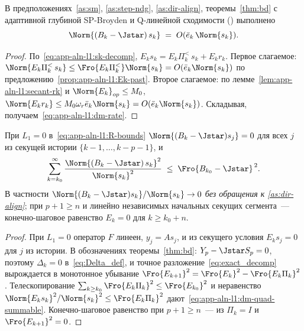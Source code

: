 \begin{lemma}
\label{lem:app-aln-l1:dm-rate}
В предположениях~\ref{as:sm}, \ref{as:step-ndg}, \ref{as:dir-align},
теоремы~\ref{thm:bd} с адаптивной глубиной SP-Broyden и Q-линейной
сходимости \textup{(}\cite[Theorem~3.4]{Agafonov2024VIJI}\textup{)}
выполнено
\begin{equation}
\Norm{(B_k - \Jstar)\,s_k} \;=\; O(\bar e_k\,\Norm{s_k}).
\label{eq:app-aln-l1:dm-rate}
\end{equation}
\end{lemma}

\begin{proof}
По~\eqref{eq:app-aln-l1:sk-decomp},
$E_k s_k = E_k\Pi_k^{<}\,s_k + E_k r_k$. Первое слагаемое:
$\Norm{E_k\Pi_k^{<}\,s_k} \le \Fro{E_k\Pi_k^{<}}\Norm{s_k} = O(\bar e_k\Norm{s_k})$
по предложению~\ref{prop:app-aln-l1:Ek-past}. Второе слагаемое: по
лемме~\ref{lem:app-aln-l1:secant-rk} и $\Norm{E_k}_{op}\le M_0$,
$\Norm{E_k r_k} \le M_0\omega_r\bar e_k\Norm{s_k} = O(\bar e_k\Norm{s_k})$.
Складывая, получаем~\eqref{eq:app-aln-l1:dm-rate}.
\end{proof}

\begin{proposition}[Линейный случай: $L_1=0$ влечёт~\eqref{eq:app-aln-l1:dm-rate} безусловно]
\label{prop:app-aln-l1:dm-quad}
При $L_1 = 0$ в~\eqref{eq:app-aln-l1:R-bounds}
$\Norm{(B_k - \Jstar)s_j} = 0$ для всех $j$ из секущей истории
$\{k-1,\ldots,k-p-1\}$, и
\begin{equation}
\sum_{k=k_0}^{\infty} \frac{\Norm{(B_k-\Jstar)\,s_k}^{2}}{\Norm{s_k}^{2}}
\;\le\; \Fro{B_{k_0} - \Jstar}^{\,2}.
\label{eq:app-aln-l1:dm-quad-summable}
\end{equation}
В частности $\Norm{(B_k-\Jstar)s_k}/\Norm{s_k} \to 0$ \emph{без обращения к
\ref{as:dir-align}}; при $p+1 \ge n$ и линейно независимых начальных
секущих сегмента~--- конечно-шаговое равенство $E_k = 0$ для $k \ge k_0+n$.
\end{proposition}

\begin{proof}
При $L_1 = 0$ оператор $F$ линеен, $y_j = A s_j$, и из секущего условия
$E_k s_j = 0$ для $j$ из истории. В обозначениях теоремы~\ref{thm:bd}:
$Y_p - \Jstar S_p = 0$, поэтому $\Delta_k = 0$ в~\eqref{eq:Delta_def}, и
точное разложение~\eqref{eq:exact_decomp} вырождается в монотонное убывание
$\Fro{E_{k+1}}^{2} = \Fro{E_k}^{2} - \Fro{E_k\Pi_k}^{2}$. Телескопирование
$\sum_{k\ge k_0}\Fro{E_k\Pi_k}^{2} \le \Fro{E_{k_0}}^{2}$ и неравенство
$\Norm{E_k s_k}^{2}/\Norm{s_k}^{2} \le \Fro{E_k\Pi_k}^{2}$
дают~\eqref{eq:app-aln-l1:dm-quad-summable}. Конечно-шаговое равенство
при $p+1\ge n$~--- из $\Pi_k = I$ и $\Fro{E_{k+1}}^{2} = 0$.
\end{proof}

